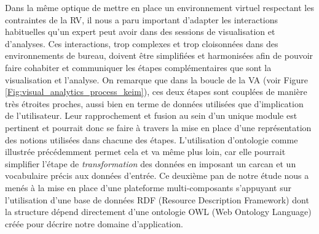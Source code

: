 Dans la même optique de mettre en place un environnement virtuel respectant les contraintes de la RV, il nous a paru important d'adapter les interactions habituelles qu'un expert peut avoir dans des sessions de visualisation et d'analyses. Ces interactions, trop complexes et trop cloisonnées dans des environnements de bureau, doivent être simplifiées et harmonisées afin de pouvoir faire cohabiter et communiquer les étapes complémentaires que sont la visualisation et l'analyse. On remarque que dans la boucle de la VA (voir Figure \ref{Fig:visual_analytics_process_keim}), ces deux étapes sont couplées de manière très étroites proches, aussi bien en terme de données utilisées que d'implication de l'utilisateur. Leur rapprochement et fusion au sein d'un unique module est pertinent et pourrait donc se faire à travers la mise en place d'une représentation des notions utilisées dans chacune des étapes. L'utilisation d'ontologie comme illustrée précédemment permet cela et va même plus loin, car elle pourrait simplifier l'étape de \textit{transformation} des données en imposant un carcan et un vocabulaire précis aux données d'entrée. Ce deuxième pan de notre étude nous a menés à la mise en place d'une plateforme multi-composants s'appuyant sur l'utilisation d'une base de données RDF (Resource Description Framework) dont la structure dépend directement d'une ontologie OWL (Web Ontology Language) créée pour décrire notre domaine d'application.














